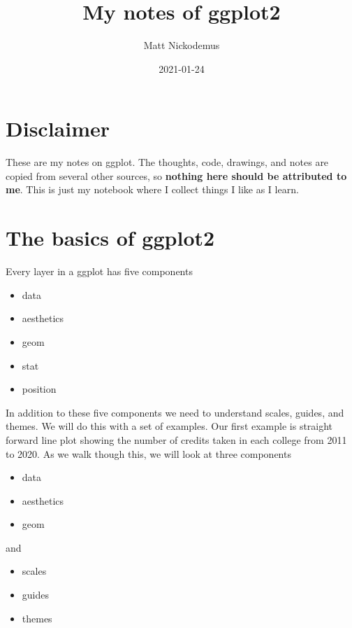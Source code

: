 \documentclass[
]{book}
\title{My notes of ggplot2}
\author{Matt Nickodemus}
\date{2021-01-24}
\providecommand{\tightlist}{%
  \setlength{\itemsep}{0pt}\setlength{\parskip}{0pt}}
\begin{document}
\maketitle

{
\setcounter{tocdepth}{1}
\tableofcontents
}
\hypertarget{disclaimer}{%
\chapter{Disclaimer}\label{disclaimer}}

These are my notes on ggplot. The thoughts, code, drawings, and notes are copied from several other sources, so \textbf{nothing here should be attributed to me}. This is just my notebook where I collect things I like as I learn.

\hypertarget{the-basics-of-ggplot2}{%
\chapter{The basics of ggplot2}\label{the-basics-of-ggplot2}}

Every layer in a ggplot has five components

\begin{itemize}
\tightlist
\item
  data
\item
  aesthetics
\item
  geom
\item
  stat
\item
  position
\end{itemize}

In addition to these five components we need to understand scales, guides, and themes. We will do this with a set of examples. Our first example is straight forward line plot showing the number of credits taken in each college from 2011 to 2020. As we walk though this, we will look at three components

\begin{itemize}
\tightlist
\item
  data
\item
  aesthetics
\item
  geom
\end{itemize}

and

\begin{itemize}
\tightlist
\item
  scales
\item
  guides
\item
  themes
\end{itemize}
\end{document}
